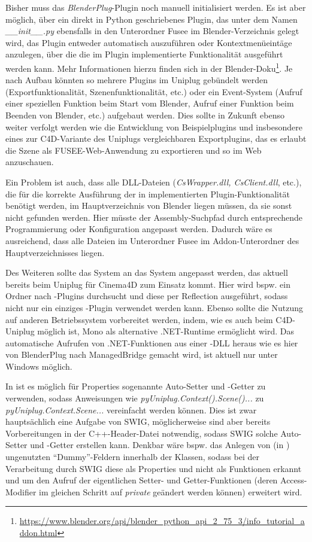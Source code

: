Bisher muss das \emph{BlenderPlug}-Plugin noch manuell initialisiert werden. Es ist aber möglich, über ein direkt in Python geschriebenes Plugin, das unter dem Namen \emph{\_\_init\_\_.py} ebensfalls in den Unterordner Fusee im Blender-Verzeichnis gelegt wird, das Plugin entweder automatisch auszuführen oder Kontextmenüeintäge anzulegen, über die die im Plugin implementierte Funktionalität ausgeführt werden kann. Mehr Informationen hierzu finden sich in der Blender-Doku\footnote{\url{https://www.blender.org/api/blender_python_api_2_75_3/info_tutorial_addon.html}}. Je nach Aufbau könnten so mehrere Plugins im Uniplug gebündelt werden (Exportfunktionalität, Szenenfunktionalität, etc.) oder ein Event-System (Aufruf einer speziellen Funktion beim Start vom Blender, Aufruf einer Funktion beim Beenden von Blender, etc.) aufgebaut werden. Dies sollte in Zukunft ebenso weiter verfolgt werden wie die Entwicklung von Beispielplugins und insbesondere eines zur C4D-Variante des Uniplugs vergleichbaren Exportplugins, das es erlaubt die Szene als FUSEE-Web-Anwendung zu exportieren und so im Web anzuschauen.

Ein Problem ist auch, dass alle DLL-Dateien (\emph{CsWrapper.dll, CsClient.dll}, etc.), die für die korrekte Ausführung der in \CS implementierten Plugin-Funktionalität benötigt werden, im Hauptverzeichnis von Blender liegen müssen, da sie sonst nicht gefunden werden. Hier müsste der Assembly-Suchpfad durch entsprechende Programmierung oder Konfiguration angepasst werden. Dadurch wäre es ausreichend, dass alle Dateien im Unterordner Fusee im Addon-Unterordner des Hauptverzeichnisses liegen.


Des Weiteren sollte das System an das System angepasst werden, das aktuell bereits beim Uniplug für Cinema4D zum Einsatz kommt. Hier wird bspw. ein Ordner nach \CS-Plugins durchsucht und diese per Reflection ausgeführt, sodass nicht nur ein einziges \CS-Plugin verwendet werden kann. Ebenso sollte die Nutzung auf anderen Betriebssystem vorbereitet werden, indem, wie es auch beim C4D-Uniplug möglich ist, Mono als alternative .NET-Runtime ermöglicht wird. Das automatische Aufrufen von .NET-Funktionen aus einer \CC-DLL heraus wie es hier von BlenderPlug nach ManagedBridge gemacht wird, ist aktuell nur unter Windows möglich.

In \CS{} ist es möglich für Properties sogenannte Auto-Setter und -Getter zu verwenden, sodass Anweisungen wie \emph{pyUniplug.Context().Scene()...} zu \emph{pyUniplug.Context.Scene...} vereinfacht werden können. Dies ist zwar hauptsächlich eine Aufgabe von SWIG, möglicherweise sind aber bereits Vorbereitungen in der C++-Header-Datei notwendig, sodass SWIG solche Auto-Setter und -Getter erstellen kann. Denkbar wäre bspw. das Anlegen von (in \CC) ungenutzten \enquote{Dummy}-Feldern innerhalb der Klassen, sodass bei der Verarbeitung durch SWIG diese als Properties und nicht als Funktionen erkannt und um den Aufruf der eigentlichen Setter- und Getter-Funktionen (deren Access-Modifier im gleichen Schritt auf \emph{private} geändert werden können) erweitert wird.

